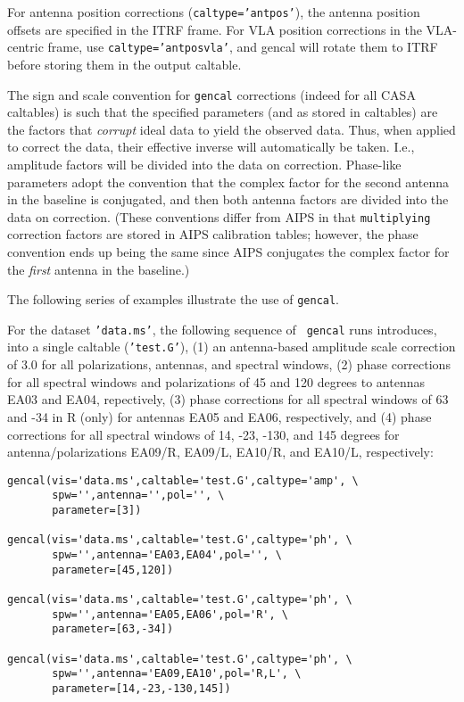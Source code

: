 For antenna position corrections ({\tt caltype='antpos'}), the antenna
position offsets are specified in the ITRF frame.  For VLA position
corrections in the VLA-centric frame, use {\tt caltype='antposvla'},
and gencal will rotate them to ITRF before storing them in the output
caltable.

The sign and scale convention for {\tt gencal} corrections (indeed for
all CASA caltables) is such that the specified parameters (and as
stored in caltables) are the factors that {\em corrupt} ideal data to
yield the observed data.  Thus, when applied to correct the data,
their effective inverse will automatically be taken.  I.e., amplitude
factors will be divided into the data on correction.  Phase-like
parameters adopt the convention that the complex factor for the second
antenna in the baseline is conjugated, and then both antenna factors
are divided into the data on correction.  (These conventions differ
from AIPS in that {\tt multiplying} correction factors are stored in
AIPS calibration tables; however, the phase convention ends up being
the same since AIPS conjugates the complex factor for the {\em first}
antenna in the baseline.)

The following series of examples illustrate the use of {\tt gencal}.

For the dataset {\tt 'data.ms'}, the following sequence of {\tt
gencal} runs introduces, into a single caltable ({\tt 'test.G'}), (1)
an antenna-based amplitude scale correction of $3.0$ for all
polarizations, antennas, and spectral windows, (2) phase corrections
for all spectral windows and polarizations of 45 and 120 degrees to
antennas EA03 and EA04, repectively, (3) phase corrections for all
spectral windows of 63 and -34 in R (only) for antennas EA05 and EA06,
respectively, and (4) phase corrections for all spectral windows of
14, -23, -130, and 145 degrees for antenna/polarizations EA09/R,
EA09/L, EA10/R, and EA10/L, respectively:

\small
\begin{verbatim}
gencal(vis='data.ms',caltable='test.G',caltype='amp', \
       spw='',antenna='',pol='', \
       parameter=[3])

gencal(vis='data.ms',caltable='test.G',caltype='ph', \
       spw='',antenna='EA03,EA04',pol='', \
       parameter=[45,120])

gencal(vis='data.ms',caltable='test.G',caltype='ph', \
       spw='',antenna='EA05,EA06',pol='R', \
       parameter=[63,-34])

gencal(vis='data.ms',caltable='test.G',caltype='ph', \
       spw='',antenna='EA09,EA10',pol='R,L', \
       parameter=[14,-23,-130,145])
\end{verbatim}
\normalsize

